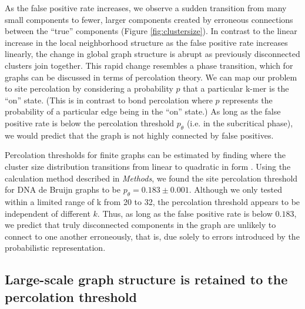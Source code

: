 \documentclass{pnastwo}
\begin{document}
\begin{article}
As the false positive rate increases, we observe a sudden transition
from many small components to fewer, larger components created by erroneous connections between the ``true'' components (Figure \ref{fig:clustersize}).  In contrast to the linear increase in the
local neighborhood structure as the false positive rate increases
linearly, the change in global graph structure is abrupt as previously
disconnected clusters join together.  This rapid change resembles a
phase transition, which for graphs can be discussed in terms of
percolation theory. We can map our problem to site percolation by
considering a probability $p$ that a particular k-mer is the ``on''
state. (This is in contrast to bond percolation where $p$ represents
the probability of a particular edge being in the ``on'' state.) As
long as the false positive rate is below the percolation threshold
$p_\theta$ (i.e. in the subcritical phase), we would predict that the graph
is not highly connected by false positives.


Percolation thresholds for finite graphs can be estimated by finding
where the cluster size distribution transitions from linear to
quadratic in form \cite{stauffer1979scaling}.  Using the calculation
method described in \emph{Methods}, we found the site percolation
threshold for DNA de Bruijn graphs to be $p_\theta = 0.183 \pm 0.001$.
Although we only tested within a limited range of k from 20 to 32, the
percolation threshold appears to be independent of different $k$.
Thus, as long as the false positive rate is below $0.183$, we
predict that truly disconnected components in the graph are unlikely
to connect to one another erroneously, that is, due solely to errors
introduced by the probabilistic representation.

\subsection{Large-scale graph structure is retained to the percolation threshold}


\end{article}
\end{document}

